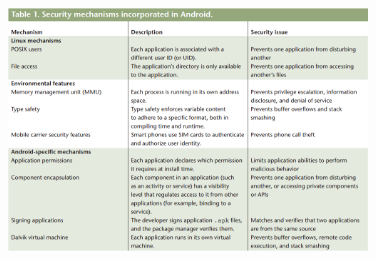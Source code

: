 \begin{figure}[h!]
    \centering
    \includegraphics[width=0.85\textwidth]{security_table}                                                                                                                                                                                                                                                                                                                                                                                                                                                                                                                                                                                                                                                                                                                                                                                                                                                                                                                                                                                                                                                                                                                                                                                                                                                                                                                                                                                                                                                                                                                                                                                                                                                                                                                                                                                                                                                                                                                                                                                                                                                                                                                                                                                                                                                                                                                                                                                                                                                                                                                               
\end{figure}
